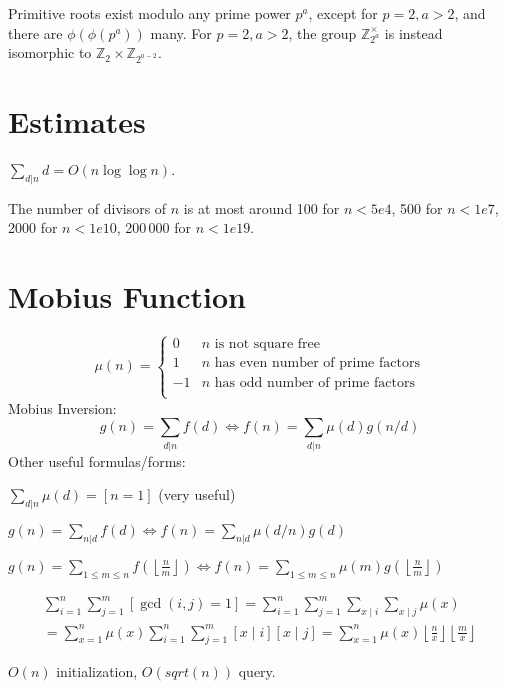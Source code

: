 	Primitive roots exist modulo any prime power $p^a$, except for $p = 2, a > 2$, and there are $\phi(\phi(p^a))$ many.
	For $p = 2, a > 2$, the group $\mathbb Z_{2^a}^\times$ is instead isomorphic to $\mathbb Z_2 \times \mathbb Z_{2^{a-2}}$.

\section{Estimates}
	$\sum_{d|n} d = O(n \log \log n)$.

	The number of divisors of $n$ is at most around 100 for $n < 5e4$, 500 for $n < 1e7$, 2000 for $n < 1e10$, 200\,000 for $n < 1e19$.

\section{Mobius Function}
\[
	\mu(n) = \begin{cases} 0 & n \textrm{ is not square free}\\ 1 & n \textrm{ has even number of prime factors}\\ -1 & n \textrm{ has odd number of prime factors}\\\end{cases}
\]
  Mobius Inversion:
  \[ g(n) = \sum_{d|n} f(d) \Leftrightarrow f(n) = \sum_{d|n} \mu(d)g(n/d) \]
  Other useful formulas/forms:

  $ \sum_{d | n} \mu(d) = [ n = 1] $ (very useful)

  $ g(n) = \sum_{n|d} f(d) \Leftrightarrow f(n) = \sum_{n|d} \mu(d/n)g(d)$

 $ g(n) = \sum_{1 \leq m \leq n} f(\left\lfloor\frac{n}{m}\right \rfloor ) \Leftrightarrow f(n) = \sum_{1\leq m\leq n} \mu(m)g(\left\lfloor\frac{n}{m}\right\rfloor)$

 \begin{small}
 \begin{equation}
	\begin{gathered}
	\sum_{i=1}^n \sum_{j=1}^m[\operatorname{gcd}(i, j)=1]=\sum_{i=1}^n \sum_{j=1}^m \sum_{x \mid i} \sum_{x \mid j} \mu(x) \\
	=\sum_{x=1}^n \mu(x) \sum_{i=1}^n \sum_{j=1}^m[x \mid i][x \mid j] 
	=\sum_{x=1}^n \mu(x)\left\lfloor\frac{n}{x}\right\rfloor\left\lfloor\frac{m}{x}\right\rfloor
	\end{gathered}
	\end{equation}
\end{small}
$O(n)$ initialization, $O(sqrt(n))$ query.

